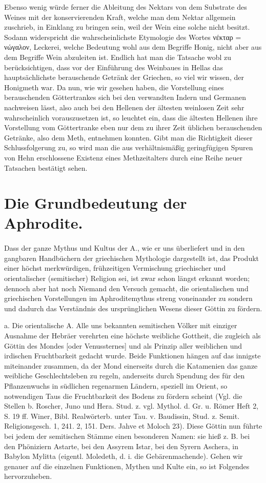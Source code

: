 \documentclass[a4paper, 11pt, oneside]{article}
\begin{document}
Ebenso wenig würde ferner die Ableitung des Nektars von dem Substrate des Weines mit der konservierenden Kraft, welche man dem Nektar allgemein zuschrieb, in Einklang zu bringen sein, weil der Wein eine solche nicht besitzt. Sodann widerspricht die wahrscheinlichste Etymologie des Wortes νέκταρ = νώγαλον, Leckerei, welche Bedeutung wohl aus dem Begriffe Honig, nicht aber aus dem Begriffe Wein abzuleiten ist. Endlich hat man die Tatsache wobl zu berücksichtigen, dass vor der Einführung des Weinbaues in Hellas das hauptsächlichste berauschende Getränk der Griechen, so viel wir wissen, der Honigmeth war. Da nun, wie wir gesehen haben, die Vorstellung eines berauschenden Göttertrankes sich bei den verwandten Indern und Germanen nachweisen lässt, also auch bei den Hellenen der ältesten weinlosen Zeit sehr wahrscheinlich vorauszusetzen ist, so leuchtet ein, dass die ältesten Hellenen ihre Vorstellung vom Göttertranke eben nur dem zu ihrer Zeit üblichen berauschenden Getränke, also dem Meth, entnehmen konnten. Gibt man die Richtigkeit dieser Schlussfolgerung zu, so wird man die aus verhältnismäßig geringfügigen Spuren von Hehn erschlossene Existenz eines Methzeitalters durch eine Reihe neuer Tatsachen bestätigt sehen.
\clearpage
\section{Die Grundbedeutung der Aphrodite.}
\paragraph{}
Dass der ganze Mythus und Kultus der A., wie er uns überliefert und in den gangbaren Handbüchern der griechischen Mythologie dargestellt ist, das Produkt einer höchst merkwürdigen, frühzeitigen Vermischung griechischer und orientalischer (semitischer) Religion sei, ist zwar schon längst erkannt worden; dennoch aber hat noch Niemand den Versuch gemacht, die orientalischen und griechischen Vorstellungen im Aphroditemythus streng voneinander zu sondern und dadurch das Verständnis des ursprünglichen Wesens dieser Göttin zu fördern.

a. Die orientalische A. Alle uns bekannten semitischen Völker mit einziger Ausnahme der Hebräer verehrten eine höchste weibliche Gottheit, die zugleich als Göttin des Mondes [oder Venussternes] und als Prinzip aller weiblichen und irdischen Fruchtbarkeit gedacht wurde. Beide Funktionen hängen auf das innigste miteinander zusammen, da der Mond einerseits durch die Katamenien das ganze weibliche Geschlechtsleben zu regeln, anderseits durch Spendung des für den Pflanzenwuchs in südlichen regenarmen Ländern, speziell im Orient, so notwendigen Taus die Fruchtbarkeit des Bodens zu fördern scheint (Vgl. die Stellen b. Roscher, Juno und Hera. Stud. z. vgl. Mythol. d. Gr. u. Römer Heft 2, S. 19 ff. Winer, Bibl. Realwörterb. unter Tau. v. Baudissin, Stud. z. Semit. Religionsgesch. 1, 241. 2, 151. Ders. Jahve et Moloch 23). Diese Göttin nun führte bei jedem der semitischen Stämme einen besonderen Namen: sie hieß z. B. bei den Phöniziern Astarte, bei den Assyrem Istar, bei den Syrern Aschera, in Babylon Mylitta (eigentl. Moledeth, d. i. die Gebärenmachende). Gehen wir genauer auf die einzelnen Funktionen, Mythen und Kulte ein, so ist Folgendes hervorzuheben.
\end{document}
